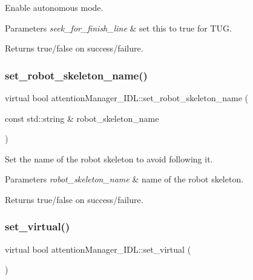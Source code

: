 Enable autonomous mode. 


\begin{DoxyParams}{Parameters}
{\em seek\+\_\+for\+\_\+finish\+\_\+line} & set this to true for T\+UG. \\
\hline
\end{DoxyParams}
\begin{DoxyReturn}{Returns}
true/false on success/failure. 
\end{DoxyReturn}
\mbox{\label{classattentionManager__IDL_ae50c946fce68f55cac50fe5136e1bc02}} 
\subsubsection{\texorpdfstring{set\+\_\+robot\+\_\+skeleton\+\_\+name()}{set\_robot\_skeleton\_name()}}
{\footnotesize\ttfamily virtual bool attention\+Manager\+\_\+\+I\+D\+L\+::set\+\_\+robot\+\_\+skeleton\+\_\+name (\begin{DoxyParamCaption}\item[{const std\+::string \&}]{robot\+\_\+skeleton\+\_\+name }\end{DoxyParamCaption})\hspace{0.3cm}{\ttfamily [virtual]}}



Set the name of the robot skeleton to avoid following it. 


\begin{DoxyParams}{Parameters}
{\em robot\+\_\+skeleton\+\_\+name} & name of the robot skeleton. \\
\hline
\end{DoxyParams}
\begin{DoxyReturn}{Returns}
true/false on success/failure. 
\end{DoxyReturn}
\mbox{\label{classattentionManager__IDL_a9278a1d0df7c7b1c3b0aa46ef78f8009}} 
\subsubsection{\texorpdfstring{set\+\_\+virtual()}{set\_virtual()}}
{\footnotesize\ttfamily virtual bool attention\+Manager\+\_\+\+I\+D\+L\+::set\+\_\+virtual (\begin{DoxyParamCaption}{ }\end{DoxyParamCaption})\hspace{0.3cm}{\ttfamily [virtual]}}



